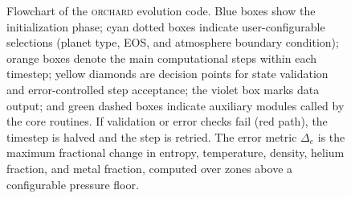 \begin{figure}[t!]
\caption{Flowchart of the \textsc{orchard} evolution code.
Blue boxes show the initialization phase; cyan dotted boxes indicate
user-configurable selections (planet type, EOS, and atmosphere boundary
condition); orange boxes denote the main computational steps within each
timestep; yellow diamonds are decision points for state validation and
error-controlled step acceptance; the violet box marks data output; and
green dashed boxes indicate auxiliary modules called by the core routines.
If validation or error checks fail (red path), the timestep is halved
and the step is retried. The error metric $\Delta_e$ is the maximum
fractional change in entropy, temperature, density, helium fraction,
and metal fraction, computed over zones above a configurable pressure
floor.}
\label{fig:flowchart}
\end{figure}




